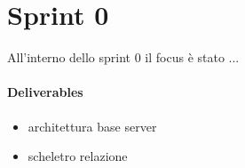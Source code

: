         

\section{Sprint 0}
All'interno dello sprint 0 il focus è stato ...
\paragraph{Deliverables} 
\begin{itemize}
    \item architettura base server
    \item scheletro relazione
\end{itemize}


